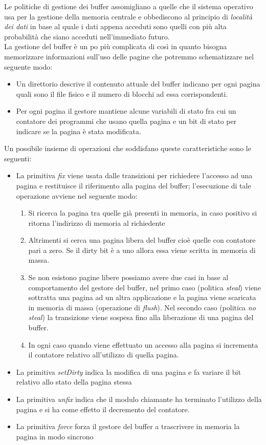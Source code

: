 Le politiche di gestione dei buffer assomigliano a quelle che il sistema operativo usa per la gestione della memoria centrale e obbediscono al principio di \emph{località dei dati} in base al quale i dati appena acceduti sono quelli con più alta probabilità che siano acceduti nell'immediato futuro.\\
La gestione del buffer è un po più complicata di così in quanto bisogna memorizzare informazioni sull'uso delle pagine che potremmo schematizzare nel seguente modo:
\begin{itemize}
  \item Un direttorio descrive il contenuto attuale del buffer indicano per ogni pagina quali sono il file fisico e il numero di blocchi ad essa corrispondenti.
  \item Per ogni pagina il gestore mantiene alcune variabili di stato fra cui un contatore dei programmi che usano quella pagina e un bit di stato per indicare se la pagina è stata modificata.
\end{itemize}
Un possibile insieme di operazioni che soddisfano queste caratteristiche sono le seguenti:
\begin{itemize}
  \item La primitiva \emph{fix} viene usata dalle transizioni per richiedere l'accesso ad una pagina e restituisce il riferimento alla pagina del buffer; l'esecuzione di tale operazione avviene nel seguente modo:
      \begin{enumerate}
        \item Si ricerca la pagina tra quelle già presenti in memoria, in caso positivo si ritorna l'indirizzo di memoria al richiedente
        \item Altrimenti si cerca una pagina libera del buffer cioè quelle con contatore pari a zero. Se il dirty bit è a uno allora essa viene scritta in memoria di massa.
        \item Se non esistono pagine libere possiamo avere due casi in base al comportamento del gestore del buffer, nel primo caso (politica \emph{steal}) viene sottratta una pagina ad un altra applicazione e la pagina viene scaricata in memoria di massa (operazione di \emph{flush}). Nel secondo caso (politica \emph{no steal}) la transizione viene sospesa fino alla liberazione di una pagina del buffer.
        \item In ogni caso quando viene effettuato un accesso alla pagina si incrementa il contatore relativo all'utilizzo di quella pagina.
      \end{enumerate}
  \item La primitiva \emph{setDirty} indica la modifica di una pagina e fa variare il bit relativo allo stato della pagina stessa
  \item La primitiva \emph{unfix} indica che il modulo chiamante ha terminato l'utilizzo della pagina e si ha come effetto il decremento del contatore.
  \item La primitiva \emph{force} forza il gestore del buffer a trascrivere in memoria la pagina in  modo sincrono
\end{itemize}
